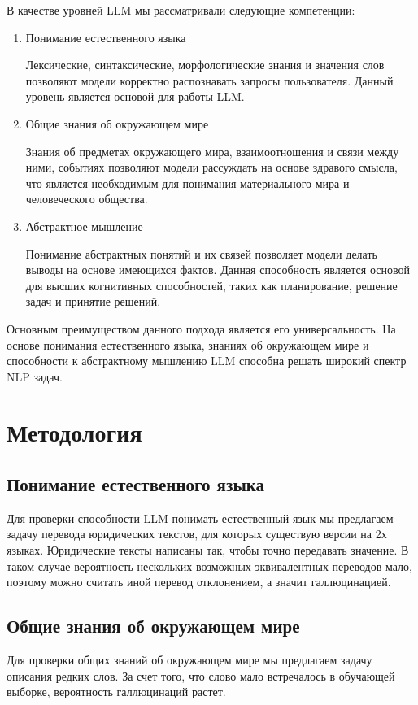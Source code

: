 \documentclass{article}
\begin{document}
В качестве уровней LLM мы рассматривали следующие компетенции:
\begin{enumerate}
    \item Понимание естественного языка

          Лексические, синтаксические, морфологические знания и значения слов позволяют модели корректно распознавать запросы пользователя. Данный уровень является основой для работы LLM.

    \item Общие знания об окружающем мире

          Знания об предметах окружающего мира, взаимоотношения и связи между ними, событиях позволяют модели рассуждать на основе здравого смысла, что является необходимым для понимания материального мира и человеческого общества.

    \item Абстрактное мышление

          Понимание абстрактных понятий и их связей позволяет модели делать выводы на основе имеющихся фактов. Данная способность является основой для высших когнитивных способностей, таких как планирование, решение задач и принятие решений.
\end{enumerate}

Основным преимуществом данного подхода является его универсальность. На основе понимания естественного языка, знаниях об окружающем мире и способности к абстрактному мышлению LLM способна решать широкий спектр NLP задач.

\section{Методология}
\subsection*{Понимание естественного языка}
Для проверки способности LLM понимать естественный язык мы предлагаем задачу перевода юридических текстов, для которых существую версии на 2х языках. Юридические тексты написаны так, чтобы точно передавать значение. В таком случае вероятность нескольких возможных эквивалентных переводов мало, поэтому можно считать иной перевод отклонением, а значит галлюцинацией.

\subsection*{Общие знания об окружающем мире}
Для проверки общих знаний об окружающем мире мы предлагаем задачу описания редких слов. За счет того, что слово мало встречалось в обучающей выборке, вероятность галлюцинаций растет.
\end{document}
